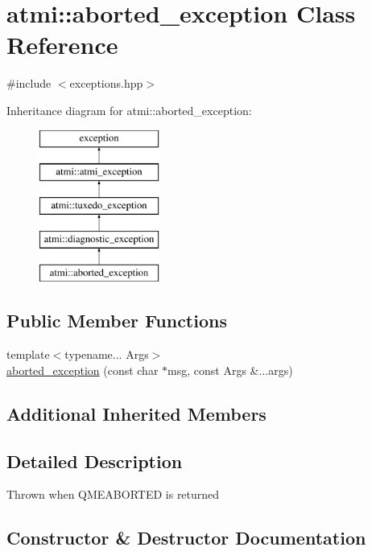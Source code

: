 \hypertarget{classatmi_1_1aborted__exception}{}\section{atmi\+:\+:aborted\+\_\+exception Class Reference}
\label{classatmi_1_1aborted__exception}


{\ttfamily \#include $<$exceptions.\+hpp$>$}

Inheritance diagram for atmi\+:\+:aborted\+\_\+exception\+:\begin{figure}[H]
\begin{center}
\leavevmode
\includegraphics[height=5.000000cm]{classatmi_1_1aborted__exception}
\end{center}
\end{figure}
\subsection*{Public Member Functions}
\begin{DoxyCompactItemize}
\item 
{\footnotesize template$<$typename... Args$>$ }\\\hyperlink{classatmi_1_1aborted__exception_ab2a2defdbafa60f2566c55a078bc502a}{aborted\+\_\+exception} (const char $\ast$msg, const Args \&...args)
\end{DoxyCompactItemize}
\subsection*{Additional Inherited Members}


\subsection{Detailed Description}
Thrown when Q\+M\+E\+A\+B\+O\+R\+T\+ED is returned 

\subsection{Constructor \& Destructor Documentation}
